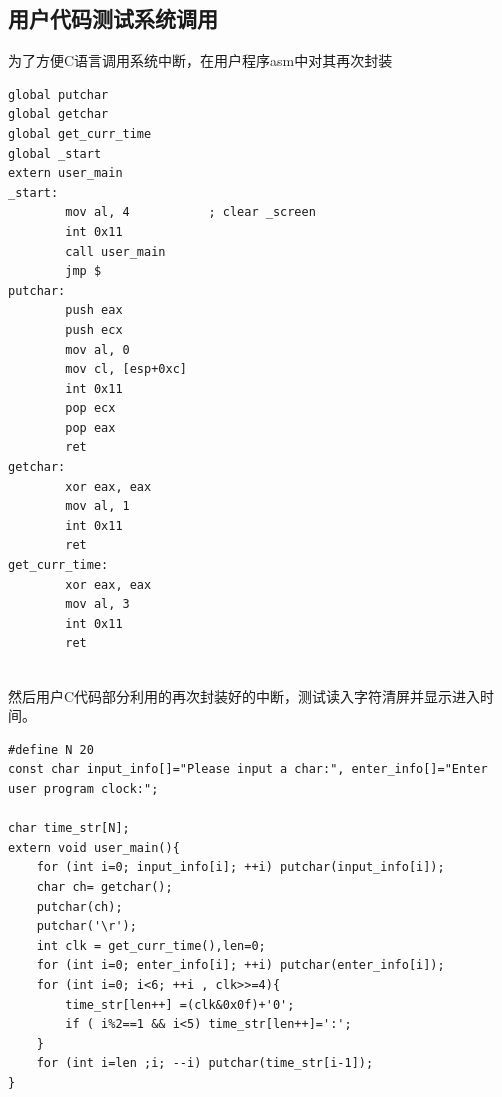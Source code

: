 \documentclass[a4paper,11pt,UTF8]{ctexart}
\begin{document}
	\subsection{用户代码测试系统调用}
			为了方便C语言调用系统中断，在用户程序asm中对其再次封装
			\begin{lstlisting}[language=={[x86masm]Assembler}keywordstyle=\color{blue!70},commentstyle=\color{red!50!green!50!blue!50},frame=shadowbox, rulesepcolor=\color{red!20!green!20!blue!20}]
global putchar
global getchar
global get_curr_time
global _start
extern user_main
_start:
		mov al, 4			; clear _screen
		int 0x11
		call user_main
		jmp $
putchar:
		push eax
		push ecx
		mov al, 0
		mov cl, [esp+0xc]
		int 0x11
		pop ecx
		pop eax
		ret
getchar:
		xor eax, eax
		mov al, 1
		int 0x11
		ret 
get_curr_time:
		xor eax, eax
		mov al, 3
		int 0x11
		ret
				
			\end{lstlisting}
		然后用户C代码部分利用的再次封装好的中断，测试读入字符清屏并显示进入时间。
			\begin{lstlisting}[language={[ANSI]C},keywordstyle=\color{blue!70},commentstyle=\color{red!50!green!50!blue!50},frame=shadowbox, rulesepcolor=\color{red!20!green!20!blue!20}]
#define N 20
const char input_info[]="Please input a char:", enter_info[]="Enter user program clock:";

char time_str[N];
extern void user_main(){
	for (int i=0; input_info[i]; ++i) putchar(input_info[i]);
	char ch= getchar();
	putchar(ch);
	putchar('\r');
	int clk = get_curr_time(),len=0;
	for (int i=0; enter_info[i]; ++i) putchar(enter_info[i]);
	for (int i=0; i<6; ++i , clk>>=4){
		time_str[len++] =(clk&0x0f)+'0';
		if ( i%2==1 && i<5) time_str[len++]=':';
	}
	for (int i=len ;i; --i) putchar(time_str[i-1]);
}
			\end{lstlisting} 
\end{document}
